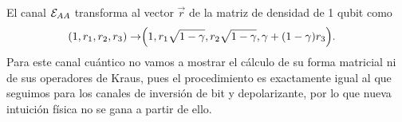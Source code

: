 El canal $\mathcal{E}_{AA}$ transforma al vector $\vec{r}$ de 
la matriz de densidad de 1 qubit como \cite{nielsen_chuang_2011}
\begin{align}
\qty(1,r_1,r_2,r_3)\rightarrow&\Big(1,r_1\sqrt{1-\gamma},
r_2\sqrt{1-\gamma},\gamma+\qty(1-\gamma)r_3\Big).
\label{eq:damp-phase}
\end{align}
Para este canal cuántico no vamos a mostrar el cálculo de 
su forma matricial ni de sus operadores de Kraus, pues el 
procedimiento es exactamente igual al que seguimos para 
los canales de inversión de bit y depolarizante, por lo que 
nueva intuición física no se gana a partir de ello.

